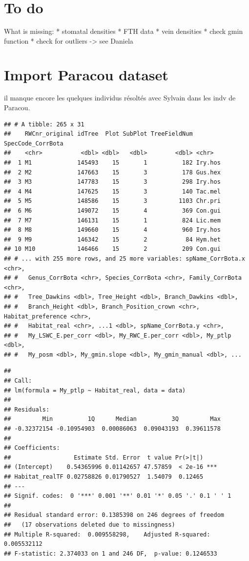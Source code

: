\documentclass[
]{book}
\begin{document}
\hypertarget{to-do}{%
\chapter{To do}\label{to-do}}

What is missing:
* stomatal densities
* FTH data
* vein densities
* check gmin function
* check for outliers -\textgreater{} see Daniela

\hypertarget{import-paracou-dataset}{%
\chapter{Import Paracou dataset}\label{import-paracou-dataset}}

il manque encore les quelques individus résoltés avec Sylvain dans les indv de Paracou.

\begin{verbatim}
## # A tibble: 265 x 31
##    RWCnr_original idTree  Plot SubPlot TreeFieldNum SpecCode_CorrBota
##    <chr>           <dbl> <dbl>   <dbl>        <dbl> <chr>            
##  1 M1             145493    15       1          182 Iry.hos          
##  2 M2             147663    15       3          178 Gus.hex          
##  3 M3             147783    15       3          298 Iry.hos          
##  4 M4             147625    15       3          140 Tac.mel          
##  5 M5             148586    15       3         1103 Chr.pri          
##  6 M6             149072    15       4          369 Con.gui          
##  7 M7             146131    15       1          824 Lic.mem          
##  8 M8             149660    15       4          960 Iry.hos          
##  9 M9             146342    15       2           84 Hym.het          
## 10 M10            146466    15       2          209 Con.gui          
## # ... with 255 more rows, and 25 more variables: spName_CorrBota.x <chr>,
## #   Genus_CorrBota <chr>, Species_CorrBota <chr>, Family_CorrBota <chr>,
## #   Tree_Dawkins <dbl>, Tree_Height <dbl>, Branch_Dawkins <dbl>,
## #   Branch_Height <dbl>, Branch_Position_crown <chr>, Habitat_preference <chr>,
## #   Habitat_real <chr>, ...1 <dbl>, spName_CorrBota.y <chr>,
## #   My_LSWC_E.per_corr <dbl>, My_RWC_E.per_corr <dbl>, My_ptlp <dbl>,
## #   My_posm <dbl>, My_gmin.slope <dbl>, My_gmin_manual <dbl>, ...
\end{verbatim}

\begin{verbatim}
## 
## Call:
## lm(formula = My_ptlp ~ Habitat_real, data = data)
## 
## Residuals:
##         Min          1Q      Median          3Q         Max 
## -0.32372154 -0.10954903  0.00086063  0.09043193  0.39611578 
## 
## Coefficients:
##                  Estimate Std. Error  t value Pr(>|t|)    
## (Intercept)    0.54365996 0.01142657 47.57859  < 2e-16 ***
## Habitat_realTF 0.02758826 0.01790527  1.54079  0.12465    
## ---
## Signif. codes:  0 '***' 0.001 '**' 0.01 '*' 0.05 '.' 0.1 ' ' 1
## 
## Residual standard error: 0.1385398 on 246 degrees of freedom
##   (17 observations deleted due to missingness)
## Multiple R-squared:  0.009558298,    Adjusted R-squared:  0.005532112 
## F-statistic: 2.374033 on 1 and 246 DF,  p-value: 0.1246533
\end{verbatim}
\end{document}
